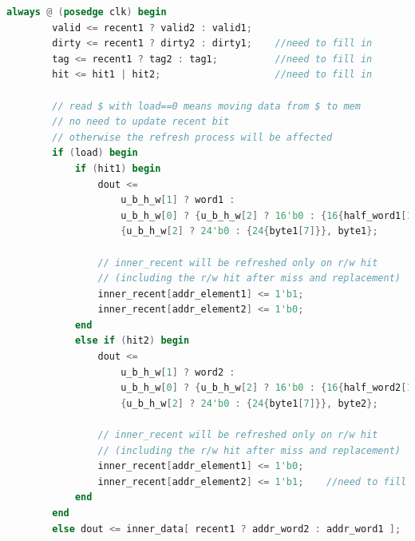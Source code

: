 \begin{lstlisting}[language = {verilog}]
    always @ (posedge clk) begin
        valid <= recent1 ? valid2 : valid1;
        dirty <= recent1 ? dirty2 : dirty1;    //need to fill in
        tag <= recent1 ? tag2 : tag1;          //need to fill in
        hit <= hit1 | hit2;                    //need to fill in
        
        // read $ with load==0 means moving data from $ to mem
        // no need to update recent bit
        // otherwise the refresh process will be affected
        if (load) begin
            if (hit1) begin
                dout <=
                    u_b_h_w[1] ? word1 :
                    u_b_h_w[0] ? {u_b_h_w[2] ? 16'b0 : {16{half_word1[15]}}, half_word1} :
                    {u_b_h_w[2] ? 24'b0 : {24{byte1[7]}}, byte1};
                
                // inner_recent will be refreshed only on r/w hit
                // (including the r/w hit after miss and replacement)
                inner_recent[addr_element1] <= 1'b1;
                inner_recent[addr_element2] <= 1'b0;
            end
            else if (hit2) begin
                dout <=
                    u_b_h_w[1] ? word2 :
                    u_b_h_w[0] ? {u_b_h_w[2] ? 16'b0 : {16{half_word2[15]}}, half_word2} :
                    {u_b_h_w[2] ? 24'b0 : {24{byte1[7]}}, byte2};
                
                // inner_recent will be refreshed only on r/w hit
                // (including the r/w hit after miss and replacement)
                inner_recent[addr_element1] <= 1'b0;
                inner_recent[addr_element2] <= 1'b1;    //need to fill in
            end
        end
        else dout <= inner_data[ recent1 ? addr_word2 : addr_word1 ];


\end{lstlisting}
